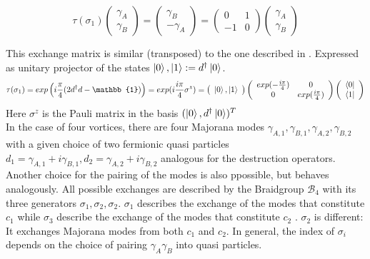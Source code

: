 \documentclass[Master]{subfiles}
\begin{document}
$$
\tau(\sigma_1)
\left(
\begin{array}{c}
      \gamma_A \\
      \gamma_B
\end{array}
\right) = 
\left(
\begin{array}{c}
      \gamma_B \\
      -\gamma_A
\end{array}
\right)
= 
\left(
\begin{array}{cc}
   0  &  1\\
   -1  & 0
\end{array}
\right)
\left(
\begin{array}{c}
      \gamma_A \\
      \gamma_B
\end{array}
\right)
$$

This exchange matrix is similar (transposed) to the one described in .
Expressed as unitary projector of the states $ \ket{0}, \ket{1} := d^{\dag}\ket{0}$.
\begin{dmath}\label{eq:2VortExchange}
 \tau(\sigma_1) = exp \left( i \frac{\pi}{4} (2d^{\dag}d - \mathbb{1})\right) = exp(i \frac{i \pi}{4} \sigma^z)
 = 
 \left(\begin{array}{cc}
      \ket{0}, \ket{1} \\
\end{array}\right)
 \left(
\begin{array}{cc}
   exp(-\frac{i \pi}{4})  &  0\\
   0  & exp(\frac{i \pi}{4})
\end{array}
\right)
\left(\begin{array}{c}
      \bra{0} \\
      \bra{1}
\end{array}\right)
\end{dmath}
Here $\sigma^z$ is the Pauli matrix in the basis $(\ket{0}, d^{\dag}\ket{0})^T$\\
In the case of four vortices, there are four Majorana modes $\gamma_{A,1} , \gamma_{B,1}, \gamma_{A,2} , \gamma_{B,2}$ with a given choice of two fermionic quasi particles $d_1 = \gamma_{A,1} + i \gamma_{B,1}, d_2 = \gamma_{A,2} + i \gamma_{B,2}$ analogous for the destruction operators. Another choice for the pairing of the modes is also ppossible, but behaves analogously. All possible exchanges are described by the Braidgroup $\mathcal{B}_4$ with its three generators $\sigma_1,\sigma_2,\sigma_2$. $\sigma_1$ describes the exchange of the modes that constitute $c_1$ while $\sigma_3$ describe the exchange of the modes that constitute $c_2$ . $\sigma_2$ is different: It exchanges Majorana modes from both $c_1$ and $c_2$. In general, the index of $\sigma_i$ depends on the choice of pairing $\gamma_A \gamma_B$ into quasi particles.
\end{document}

